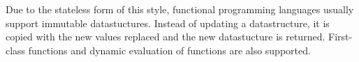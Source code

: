 Due to the stateless form of this style, functional programming languages usually support immutable datastuctures. Instead of updating a datastructure, it is copied with the new values replaced and the new datastucture is returned. First-class functions and dynamic evaluation of functions are also supported.
